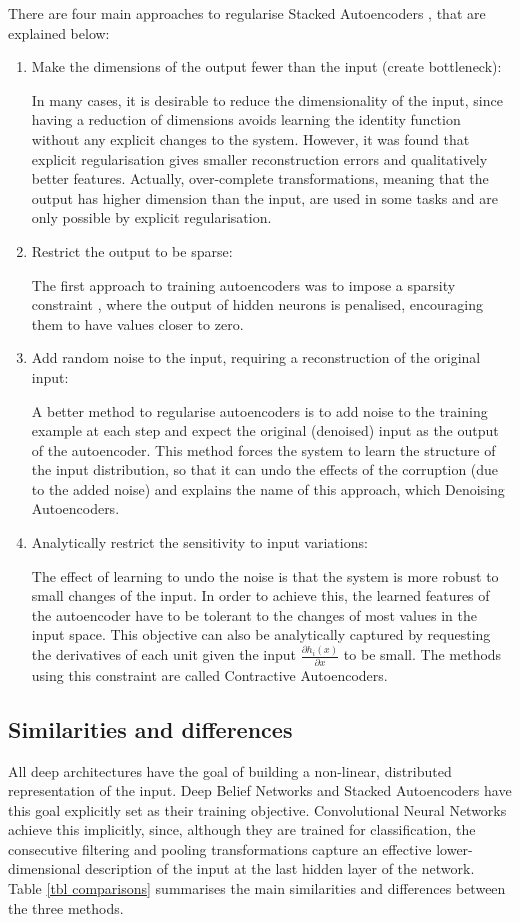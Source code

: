 \documentclass[a4paper]{article}
\begin{document}
			There are four main approaches to regularise Stacked Autoencoders \cite{Bengio2013c}, that are explained below: 
			\begin{enumerate}
				\item Make the dimensions of the output fewer than the input (create bottleneck):
				
					In many cases, it is desirable to reduce the dimensionality of the input, since having a reduction of dimensions avoids learning the identity function without any explicit changes to the system. However, it was found \cite{Bengio2013c} that explicit regularisation gives smaller reconstruction errors and qualitatively better features. Actually, over-complete transformations, meaning that the output has higher dimension than the input, are used in some tasks and are only possible by explicit regularisation.
				\item Restrict the output to be sparse:
				
					The first approach to training autoencoders was to impose a sparsity constraint \cite{Bengio2007a,Ranzato2007}, where the output of hidden neurons is penalised, encouraging them to have values closer to zero. 
				\item Add random noise to the input, requiring a reconstruction of the original input:
				
					A better method to regularise autoencoders is to add noise to the training example at each step and expect the original (denoised) input as the output of the autoencoder. This method forces the system to learn the structure of the input distribution, so that it can undo the effects of the corruption (due to the added noise) and explains the name of this approach, which Denoising Autoencoders.
				\item Analytically restrict the sensitivity to input variations:
				
					The effect of learning to undo the noise is that the system is more robust to small changes of the input. In order to achieve this, the learned features of the autoencoder have to be tolerant to the changes of most values in the input space. This objective can also be analytically captured by requesting the derivatives  of each unit given the input $ \frac{\partial h_i(x)}{\partial x} $ to be small. The methods using this constraint are called Contractive Autoencoders.
			\end{enumerate}
		\subsection{Similarities and differences}
		\label{arch. comparison}
			All deep architectures have the goal of building a non-linear, distributed representation of the input. Deep Belief Networks and Stacked Autoencoders have this goal explicitly set as their training objective. Convolutional Neural Networks achieve this implicitly, since, although they are trained for classification, the consecutive filtering and pooling transformations capture an effective lower-dimensional description of the input at the last hidden layer of the network. Table \ref{tbl comparisons} summarises the main similarities and differences between the three methods.
			
\end{document}
